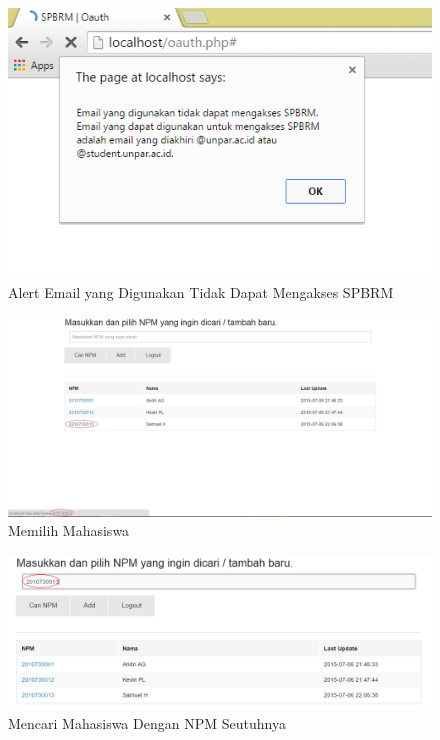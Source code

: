 \begin{figure}[H]
\centering
\includegraphics[scale=0.44]{Gambar/pengujian7.png}
\caption[Alert Email yang Digunakan Tidak Dapat Mengakses SPBRM]{Alert Email yang
Digunakan Tidak Dapat Mengakses SPBRM}
\label{fig:alert}
\end{figure}

\begin{figure}[H]
\centering
\includegraphics[scale=0.445]{Gambar/pengujian8.png}
\caption[Memilih Mahasiswa]{Memilih Mahasiswa} 
\label{fig:memilihmahasiswa}
\end{figure}

\begin{figure}[H]
\centering
\includegraphics[scale=0.44]{Gambar/pengujian9.png}
\caption[Mencari Mahasiswa Dengan NPM Seutuhnya]{Mencari Mahasiswa Dengan NPM Seutuhnya} 
\label{fig:mencarinpmutuh}
\end{figure}

